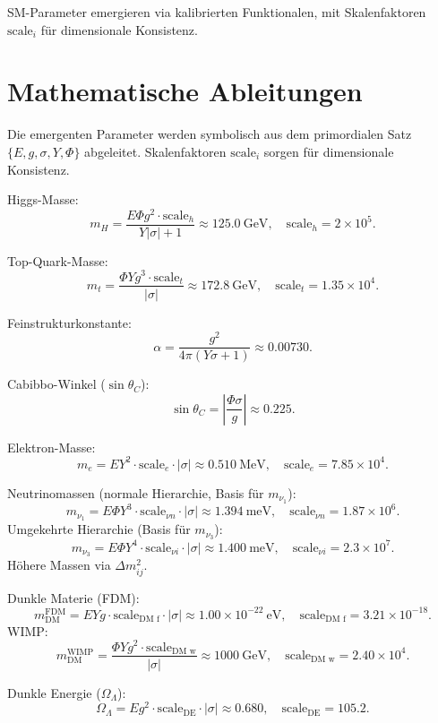 \documentclass[11pt,a4paper]{article}
\begin{document}
	SM-Parameter emergieren via kalibrierten Funktionalen, mit Skalenfaktoren $\text{scale}_i$ f{\"u}r dimensionale Konsistenz.
	
	\section{Mathematische Ableitungen}
	Die emergenten Parameter werden symbolisch aus dem primordialen Satz $\{E, g, \sigma, Y, \Phi\}$ abgeleitet. Skalenfaktoren $\text{scale}_i$ sorgen f{\"u}r dimensionale Konsistenz.
	
	Higgs-Masse:
	\[
	m_H = \frac{E \Phi g^{2} \cdot \text{scale}_h}{Y |\sigma| + 1} \approx 125.0~\text{GeV}, \quad \text{scale}_h = 2 \times 10^5.
	\]
	
	Top-Quark-Masse:
	\[
	m_t = \frac{\Phi Y g^{3} \cdot \text{scale}_t}{|\sigma|} \approx 172.8~\text{GeV}, \quad \text{scale}_t = 1.35 \times 10^4.
	\]
	
	Feinstrukturkonstante:
	\[
	\alpha = \frac{g^{2}}{4 \pi (Y \sigma + 1)} \approx 0.00730.
	\]
	
	Cabibbo-Winkel ($\sin \theta_C$):
	\[
	\sin \theta_C = \left| \frac{\Phi \sigma}{g} \right| \approx 0.225.
	\]
	
	Elektron-Masse:
	\[
	m_e = E Y^{2} \cdot \text{scale}_e \cdot |\sigma| \approx 0.510~\text{MeV}, \quad \text{scale}_e = 7.85 \times 10^4.
	\]
	
	Neutrinomassen (normale Hierarchie, Basis f{\"u}r $m_{\nu_1}$):
	\[
	m_{\nu_1} = E \Phi Y^{3} \cdot \text{scale}_{\nu n} \cdot |\sigma| \approx 1.394~\text{meV}, \quad \text{scale}_{\nu n} = 1.87 \times 10^6.
	\]
	Umgekehrte Hierarchie (Basis f{\"u}r $m_{\nu_3}$):
	\[
	m_{\nu_3} = E \Phi Y^{4} \cdot \text{scale}_{\nu i} \cdot |\sigma| \approx 1.400~\text{meV}, \quad \text{scale}_{\nu i} = 2.3 \times 10^7.
	\]
	H{\"o}here Massen via $\Delta m^2_{ij}$.
	
	Dunkle Materie (FDM):
	\[
	m_{\text{DM}}^{\text{FDM}} = E Y g \cdot \text{scale}_{\text{DM f}} \cdot |\sigma| \approx 1.00 \times 10^{-22}~\text{eV}, \quad \text{scale}_{\text{DM f}} = 3.21 \times 10^{-18}.
	\]
	WIMP:
	\[
	m_{\text{DM}}^{\text{WIMP}} = \frac{\Phi Y g^{2} \cdot \text{scale}_{\text{DM w}}}{|\sigma|} \approx 1000~\text{GeV}, \quad \text{scale}_{\text{DM w}} = 2.40 \times 10^4.
	\]
	
	Dunkle Energie ($\Omega_\Lambda$):
	\[
	\Omega_\Lambda = E g^{2} \cdot \text{scale}_{\text{DE}} \cdot |\sigma| \approx 0.680, \quad \text{scale}_{\text{DE}} = 105.2.
	\]
	
\end{document}
